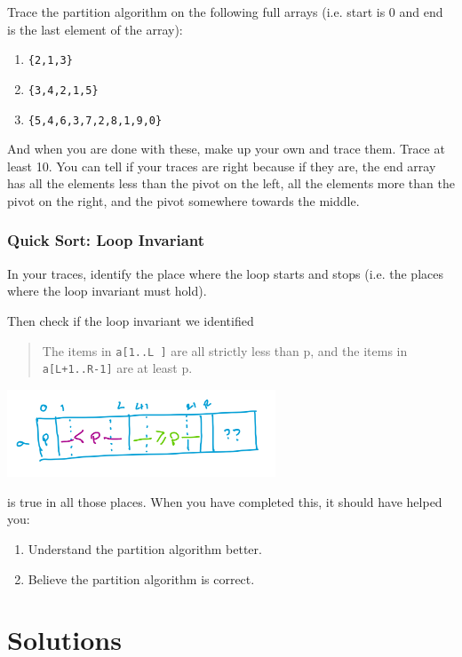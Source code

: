 \documentclass[twoside=false,DIV=14]{scrartcl}
\begin{document}
Trace the partition algorithm on the following full arrays (i.e. start is 0 and end is the last element of the array):
\begin{enumerate}
\item \verb+{2,1,3}+
\item \verb+{3,4,2,1,5}+
\item \verb|{5,4,6,3,7,2,8,1,9,0}|
\end{enumerate}
And when you are done with these, make up your own and trace them. Trace at least 10.  You can tell if your traces are right because if they are, the end array has all the elements less than the pivot on the left, all the elements more than the pivot on the right, and the pivot somewhere towards the middle.

\section{Quick Sort: Loop Invariant}
In your traces, identify the place where the loop starts and stops (i.e. the places where the loop invariant must hold).

Then check if the loop invariant we identified
\begin{quote}
    The items in \verb|a[1..L ]| are all strictly less than p, and the items in \verb|a[L+1..R-1]| are at least p.
\end{quote}

\begin{center}
\includegraphics[width=0.6\textwidth]{pivot_invariant.jpeg}
\end{center}

is true in all those places.  When you have completed this, it should have helped you:
\begin{enumerate}
\item Understand the partition algorithm better.
\item Believe the partition algorithm is correct.
\end{enumerate}
    
\newpage\setcounter{section}{0}
\part*{Solutions}
\end{document}
